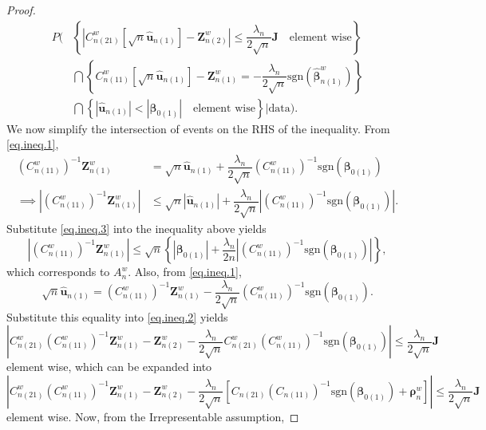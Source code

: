 \documentclass[12pt]{article}
\newcommand{\be}{\bm{\beta}} %
\newcommand{\bu}{\bm{u}} %
\newcommand{\cnwa}{C_{n(11)}^w}
\newcommand{\cnwc}{C_{n(21)}^w}
\newcommand{\znwa}{\bm{Z}_{n(1)}^w}
\newcommand{\znwb}{\bm{Z}_{n(2)}^w}
\newcommand{\huna}{\widehat{\bu}_{n(1)}}
\begin{document}
\begin{proof}
\begin{equation*}
\begin{split}
		P \bigg( 
				 &\left\{
				 			\left| \cnwc \left[ \sqrt{n} \huna \right] - \znwb \right| 
				 			\leq  \dfrac{\lambda_n}{2 \sqrt{n}} \bm{J}
				 			\quad \text{element wise}
				  \right\} \\
				 &\bigcap \left\{
				 			\cnwa \left[ \sqrt{n} \huna \right] - \znwa 
				 			= - \dfrac{\lambda_n}{2 \sqrt{n}}
				 			\text{sgn} \left( \widehat{\be}^w_{n(1)} \right)
				 			\right\} \\
				 &\bigcap \left\{
				 				\left| \huna \right| < \left| \be_{0(1)} \right|
				 				\quad \text{element wise}
				 			\right\}
				 \bigg| \text{data}
		  \bigg).
		\end{split}
	\end{equation*}
	We now simplify the intersection of events on the RHS of the inequality. From \eqref{eq.ineq.1}, 
	\begin{align*}
		\left( \cnwa \right)^{-1} \znwa 
		&= \sqrt{n} \huna
		+ \dfrac{\lambda_n}{2 \sqrt{n}} 
			\left( \cnwa \right)^{-1} 
			\text{sgn} \left(\be_{0(1)} \right)	\\
		\implies 
			\left| \left( \cnwa \right)^{-1} \znwa \right|
			&\leq \sqrt{n} \left| \huna \right|
			+ \dfrac{\lambda_n}{2 \sqrt{n}} 
			 \left| 
			 	\left( \cnwa \right)^{-1} 
				\text{sgn} \left(\be_{0(1)} \right)
			 \right|.
	\end{align*}
	Substitute \eqref{eq.ineq.3} into the inequality above yields
	$$
	\left| \left( \cnwa \right)^{-1} \znwa \right|
	\leq \sqrt{n} 
		 \left\{
		 		\left| \be_{0(1)} \right|
		 		+ \dfrac{\lambda_n}{2 n} 
		 			\left| 
		 				\left( \cnwa \right)^{-1} 
		 				\text{sgn} \left(\be_{0(1)} \right)
		 			\right|
		 \right\},
	$$
	which corresponds to $A_n^w$. Also, from \eqref{eq.ineq.1},
	$$
	\sqrt{n} \huna 
	= \left( \cnwa \right)^{-1}  \znwa 
	- \dfrac{\lambda_n}{2 \sqrt{n}}
		\left( \cnwa \right)^{-1} 
		\text{sgn} \left( \be_{0(1)} \right).
	$$
	Substitute this equality into \eqref{eq.ineq.2} yields
	$$
	\left|
		\cnwc \left( \cnwa \right)^{-1} \znwa - \znwb 
		- \dfrac{\lambda_n}{2 \sqrt{n}}
		  \cnwc \left( \cnwa \right)^{-1}
		  \text{sgn} \left( \be_{0(1)} \right)
	\right|
	\leq \dfrac{\lambda_n}{2 \sqrt{n}} \bm{J} 
	$$
	element wise, which can be expanded into
	$$
	\left|
		\cnwc \left( \cnwa \right)^{-1} \znwa - \znwb 
		- \dfrac{\lambda_n}{2 \sqrt{n}}
		  \left[
		  		C_{n(21)} \left( C_{n(11)} \right)^{-1}
		  		\text{sgn} \left( \be_{0(1)} \right)
		  		+ \bm{\rho}_n^w
		  \right]
	\right|
	\leq \dfrac{\lambda_n}{2 \sqrt{n}} \bm{J} 
	$$
	element wise. Now, from the Irrepresentable assumption,

\end{proof}
\end{document}

